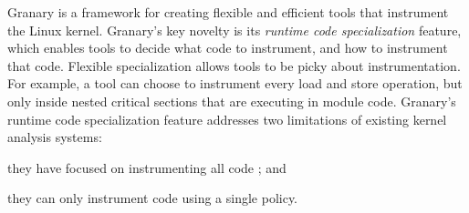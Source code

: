 \documentclass[preprint]{sigplanconf}
\begin{document}
Granary is a framework for creating flexible and efficient tools that instrument the Linux kernel. Granary's key novelty is its \emph{runtime code specialization} feature, which enables tools to decide what code to instrument, and how to instrument that code. Flexible specialization allows tools to be picky about instrumentation. For example, a tool can choose to instrument every load and store operation, but only inside nested critical sections that are executing in module code. Granary's runtime code specialization feature addresses two limitations of existing kernel analysis systems: \begin{inparaenum}[i)]
	\item they have focused on instrumenting all code \cite{DRK,btkernel,QEMU}; and
	\item they can only instrument code using a single policy.
\end{inparaenum}

\end{document}
